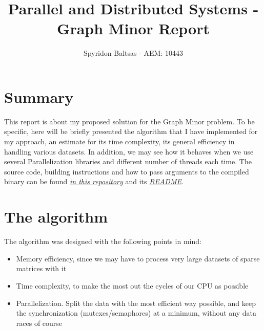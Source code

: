 \documentclass[11pt]{article}
\author{Spyridon Baltsas - AEM: 10443}
\date{}
\title{Parallel and Distributed Systems - Graph Minor Report}
\begin{document}
\maketitle

\section{Summary}
\label{sec:org131e778}
This report is about my proposed solution for the Graph Minor problem. To be specific, here will be briefly presented the algorithm that I have implemented for my approach, an estimate for its time complexity, its general efficiency in handling various datasets. In addition, we may see how it behaves when we use several Parallelization libraries and different number of threads each time. The source code, building instructions and how to pass arguments to the compiled binary can be found \href{https://github.com/thetonk/pds-solutions/tree/main/Graph\%20Minor}{\emph{in this repository}} and its \href{https://github.com/thetonk/pds-solutions/blob/main/Graph\%20Minor/README.md}{\emph{README}}.
\section{The algorithm}
\label{sec:orgc4376c1}
The algorithm was designed with the following points in mind:
\begin{itemize}
\item Memory efficiency, since we may have to process very large datasets of sparse matrices with it
\item Time complexity, to make the most out the cycles of our CPU as possible
\item Parallelization. Split the data with the most efficient way possible, and keep the synchronization (mutexes/semaphores) at a minimum, without any data races of course
\end{itemize}
\end{document}

